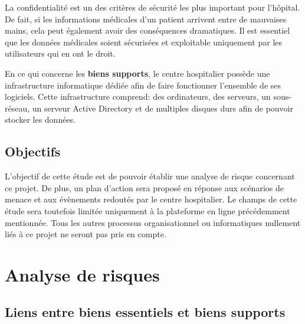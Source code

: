 \documentclass[12pt]{article}
\begin{document}
\justify
La confidentialité est un des critères de sécurité les plus important pour l'hôpital. De fait, si les informations médicales d'un patient arrivent entre de mauvaises mains, cela peut également avoir des conséquences dramatiques. Il est essentiel que les données médicales soient sécurisées et exploitable uniquement par les utilisateurs qui en ont le droit.

\justify
En ce qui concerne les \textbf{biens supports}, le centre hospitalier possède une infrastructure informatique dédiée afin de faire fonctionner l'ensemble de ses logiciels. Cette infrastructure comprend: des ordinateurs, des serveurs, un sous-réseau, un serveur Active Directory et de multiples disques durs afin de pouvoir stocker les données.

\subsection{Objectifs}

\justify
L'objectif de cette étude est de pouvoir établir une analyse de risque concernant ce projet. De plus, un plan d'action sera proposé en réponse aux scénarios de menace et aux évènements redoutés par le centre hospitalier. Le champs de cette étude sera toutefois limitée uniquement à la plateforme en ligne précédemment mentionnée. Tous les autres processus organisationnel ou informatiques nullement liés à ce projet ne seront pas pris en compte.

\section{Analyse de risques}

\subsection{Liens entre biens essentiels et biens supports}
\end{document}
